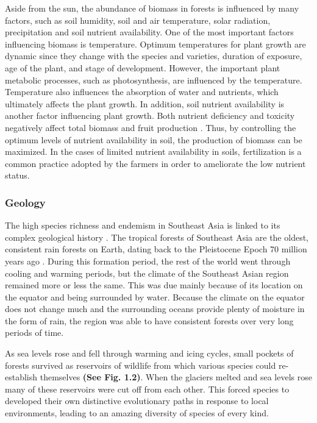 	Aside from the sun, the abundance of biomass in forests is influenced by many factors, such as soil humidity, soil and air temperature, solar radiation, precipitation and soil nutrient availability. One of the most important factors influencing biomass is temperature. Optimum temperatures for plant growth are dynamic since they change with the species and varieties, duration of exposure, age of the plant, and stage of development\citep{marshall1988environmental}. However, the important plant metabolic processes, such as photosynthesis, are influenced by the temperature. Temperature also influences the absorption of water and nutrients, which ultimately affects the plant growth. In addition, soil nutrient availability is another factor influencing plant growth. Both nutrient deficiency and toxicity negatively affect total biomass and fruit production \citep{chatzistathis2013soil}. Thus, by controlling the optimum levels of nutrient availability in soil, the production of biomass can be maximized. In the cases of limited nutrient availability in soils, fertilization is a common practice adopted by the farmers in order to ameliorate the low nutrient status. 

\subsubsection{Geology}

The high species richness and endemism in Southeast Asia is linked to its complex geological history \citep{sodhi2004southeast}. The tropical forests of Southeast Asia are the oldest, consistent rain forests on Earth, dating back to the Pleistocene Epoch 70 million years ago \cite{hutchison1989geological}. During this formation period, the rest of the world went through cooling and warming periods, but the climate of the Southeast Asian region remained more or less the same. This was due mainly because of its location on the equator and being surrounded by water. Because the climate on the equator does not change much and the surrounding oceans provide plenty of moisture in the form of rain, the region was able to have consistent forests over very long periods of time. 

As sea levels rose and fell through warming and icing cycles, small pockets of forests survived as reservoirs of wildlife from which various species could re-establish themselves \textbf{(See Fig. 1.2)}. When the glaciers melted and sea levels rose many of these reservoirs were cut off from each other. This forced species to developed their own distinctive evolutionary paths in response to local environments, leading to an amazing diversity of species of every kind.
  
